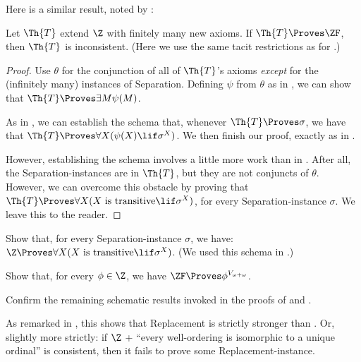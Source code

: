 \documentclass[../../../include/open-logic-section]{subfiles}
\begin{document}
Here is a similar result, noted by \citet[223]{Potter2004}:

\begin{prop}
	Let $\Th{T}$ extend $\Z$ with finitely many new axioms. If $\Th{T} \Proves \ZF$, then $\Th{T}$ is inconsistent. (Here we use the same tacit restrictions as for .)
\end{prop}
\begin{proof}
	Use $\theta$ for the conjunction of all of $\Th{T}$'s axioms \emph{except} for the (infinitely many) instances of Separation. Defining $\psi$ from $\theta$ as in , we can show that $\Th{T} \Proves \exists M \psi(M)$. 
	
	As in , we can establish the schema that, whenever $\Th{T} \Proves \sigma$, we have that $\Th{T} \Proves \forall X(\psi(X) \lif \sigma^X)$. We then finish our proof, exactly as in .
	
	However, establishing the schema involves a little more work than in . After all, the Separation-instances are in $\Th{T}$, but they are not conjuncts of $\theta$. However, we can overcome this obstacle by proving that $\Th{T} \Proves \forall X(X\text{ is transitive} \lif \sigma^X)$, for every Separation-instance $\sigma$. We leave this to the reader. 
\end{proof}
\begin{prob}
	Show that, for every Separation-instance $\sigma$, we have: $\Z \Proves \forall X(X\text{ is transitive} \lif \sigma^X)$. (We used this schema in .)
\end{prob}
\begin{prob}
	Show that, for every $\phi \in \Z$, we have $\ZF \Proves \phi^{V_{\omega+\omega}}$.
\end{prob}
\begin{prob}
	Confirm the remaining schematic results invoked in the proofs of  and  .
\end{prob}

As remarked in , this shows that Replacement is strictly stronger than
. Or, slightly more strictly: if $\Z$ + ``every well-ordering is isomorphic to a unique ordinal'' is consistent, then it fails to prove some Replacement-instance.


\end{document}
